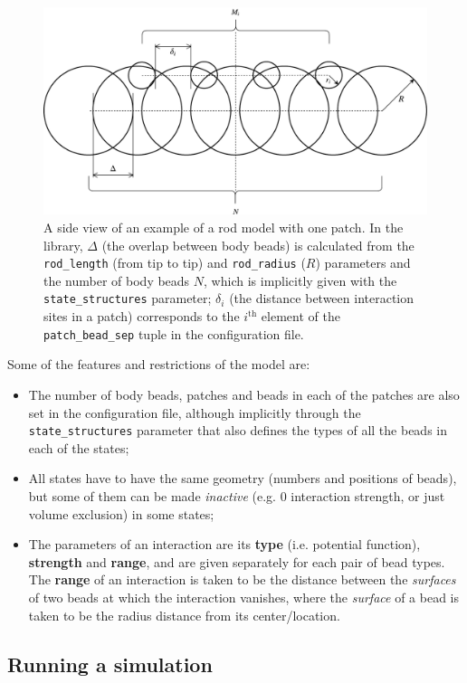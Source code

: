 \documentclass[a4paper]{article}
\begin{document}
\begin{figure}[!h]
\centering
\includegraphics[width=0.7\linewidth]{rod_model-side_view.pdf}
\captionsetup{width=.7\linewidth}
\caption{A side view of an example of a rod model with one patch. In the library, $\Delta$ (the overlap
between body beads) is calculated from the \texttt{rod\_length} (from tip to tip) and
\texttt{rod\_radius} ($R$) parameters and the number of body beads $N$, which is implicitly given with
the \texttt{state\_structures} parameter; $\delta_i$ (the distance between interaction sites
in a patch) corresponds to the $i^\text{th}$ element of the \texttt{patch\_bead\_sep} tuple in the
configuration file.}
\label{img:rod_side}
\end{figure}

\vspace{1em}

Some of the features and restrictions of the model are:
\begin{itemize}
	\item The number of body beads, patches and beads in each of the patches are also set in the
	configuration file, although implicitly through the \texttt{state\_structures} parameter that also
	defines the types of all the beads in each of the states;
	\item All states have to have the same geometry (numbers and positions of beads), but some of them can
	be made \emph{inactive} (e.g. 0 interaction strength, or just volume exclusion) in some states;
	\item The parameters of an interaction are its \textbf{type} (i.e. potential function),
	\textbf{strength} and \textbf{range}, and are given separately for each pair of bead types. The
	\textbf{range} of an interaction is taken to be the distance between the \emph{surfaces} of two beads at
	which the interaction vanishes, where the \emph{surface} of a bead is taken to be the radius distance
	from its center/location.
\end{itemize}

\subsection{Running a simulation}
\end{document}
